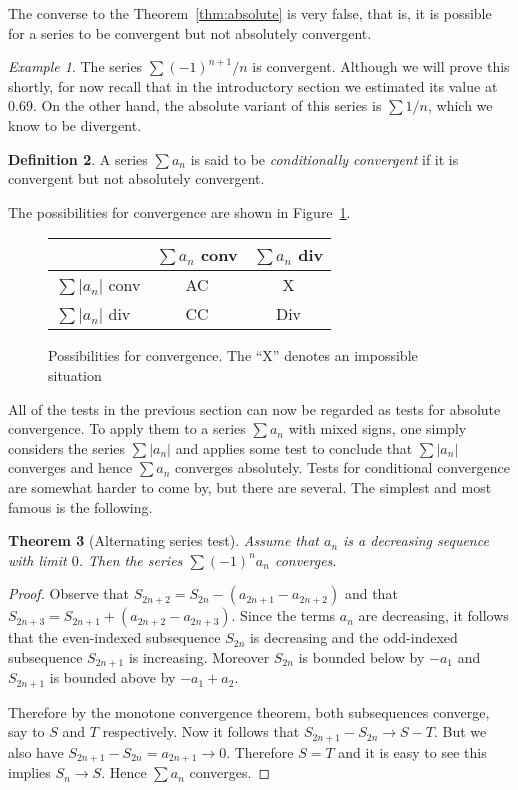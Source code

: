 \documentclass[11pt,oneside]{amsbook}
\theoremstyle{definition}
\theoremstyle{plain}
\newtheorem{theorem}{Theorem}[section]
\theoremstyle{definition}
\newtheorem{definition}[theorem]{Definition}
\theoremstyle{remark}
\newtheorem{example}[theorem]{Example}
\numberwithin{equation}{section}
\numberwithin{figure}{section}
\begin{document}
The converse to the Theorem~\ref{thm:absolute} is very false, that is, it is possible for a series to be convergent but not absolutely convergent.

\begin{example}
  The series $\sum(-1)^{n+1}/n$ is convergent. Although we will prove this shortly, for now recall that in the introductory section we estimated its value at 0.69. On the other hand, the absolute variant of this series is $\sum 1/n$, which we know to be divergent.
\end{example}

\begin{definition}
  A series $\sum a_n$ is said to be \emph{conditionally convergent} if it is convergent but not absolutely convergent.
\end{definition}

The possibilities for convergence are shown in Figure~\ref{fig:convergence}.

\begin{figure}[h]
  \begin{tabular}{l|cc}
                     & $\sum a_n$ conv & $\sum a_n$ div\\\hline
    $\sum|a_n|$ conv & AC & X\\
    $\sum|a_n|$ div & CC & Div
  \end{tabular}
  \caption{Possibilities for convergence. The ``X'' denotes an impossible situation\label{fig:convergence}}
\end{figure}

All of the tests in the previous section can now be regarded as tests for absolute convergence. To apply them to a series $\sum a_n$ with mixed signs, one simply considers the series $\sum|a_n|$ and applies some test to conclude that $\sum|a_n|$ converges and hence $\sum a_n$ converges absolutely. Tests for conditional convergence are somewhat harder to come by, but there are several. The simplest and most famous is the following.

\begin{theorem}[Alternating series test]
  Assume that $a_n$ is a decreasing sequence with limit $0$. Then the series $\sum(-1)^na_n$ converges.
\end{theorem}

\begin{proof}
  Observe that $S_{2n+2}=S_{2n}-(a_{2n+1}-a_{2n+2})$ and that $S_{2n+3}=S_{2n+1}+(a_{2n+2}-a_{2n+3})$. Since the terms $a_n$ are decreasing, it follows that the even-indexed subsequence $S_{2n}$ is decreasing and the odd-indexed subsequence $S_{2n+1}$ is increasing. Moreover $S_{2n}$ is bounded below by $-a_1$ and $S_{2n+1}$ is bounded above by $-a_1+a_2$.

  Therefore by the monotone convergence theorem, both subsequences converge, say to $S$ and $T$ respectively. Now it follows that $S_{2n+1}-S_{2n}\to S-T$. But we also have $S_{2n+1}-S_{2n}=a_{2n+1}\to0$. Therefore $S=T$ and it is easy to see this implies $S_n\to S$. Hence $\sum a_n$ converges.
\end{proof}
\end{document}
